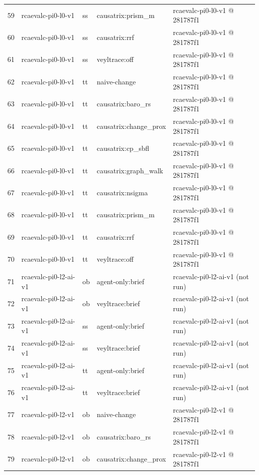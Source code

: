 \begin{longtable}{@{}r>{\raggedright\arraybackslash}p{87.0pt}>{\raggedright\arraybackslash}p{18.0pt}>{\raggedright\arraybackslash}p{63.0pt}>{\raggedright\arraybackslash}p{108.0pt}@{}}
59 & rcaevalc-pi0-l0-v1 & ss & causatrix:prism\_m & rcaevalc-pi0-l0-v1 @ 281787f1 \\
60 & rcaevalc-pi0-l0-v1 & ss & causatrix:rrf & rcaevalc-pi0-l0-v1 @ 281787f1 \\
61 & rcaevalc-pi0-l0-v1 & ss & veyltrace:off & rcaevalc-pi0-l0-v1 @ 281787f1 \\
62 & rcaevalc-pi0-l0-v1 & tt & naive-change & rcaevalc-pi0-l0-v1 @ 281787f1 \\
63 & rcaevalc-pi0-l0-v1 & tt & causatrix:baro\_rs & rcaevalc-pi0-l0-v1 @ 281787f1 \\
64 & rcaevalc-pi0-l0-v1 & tt & causatrix:change\_prox & rcaevalc-pi0-l0-v1 @ 281787f1 \\
65 & rcaevalc-pi0-l0-v1 & tt & causatrix:cp\_sbfl & rcaevalc-pi0-l0-v1 @ 281787f1 \\
66 & rcaevalc-pi0-l0-v1 & tt & causatrix:graph\_walk & rcaevalc-pi0-l0-v1 @ 281787f1 \\
67 & rcaevalc-pi0-l0-v1 & tt & causatrix:nsigma & rcaevalc-pi0-l0-v1 @ 281787f1 \\
68 & rcaevalc-pi0-l0-v1 & tt & causatrix:prism\_m & rcaevalc-pi0-l0-v1 @ 281787f1 \\
69 & rcaevalc-pi0-l0-v1 & tt & causatrix:rrf & rcaevalc-pi0-l0-v1 @ 281787f1 \\
70 & rcaevalc-pi0-l0-v1 & tt & veyltrace:off & rcaevalc-pi0-l0-v1 @ 281787f1 \\
71 & rcaevalc-pi0-l2-ai-v1 & ob & agent-only:brief & rcaevalc-pi0-l2-ai-v1 (not run) \\
72 & rcaevalc-pi0-l2-ai-v1 & ob & veyltrace:brief & rcaevalc-pi0-l2-ai-v1 (not run) \\
73 & rcaevalc-pi0-l2-ai-v1 & ss & agent-only:brief & rcaevalc-pi0-l2-ai-v1 (not run) \\
74 & rcaevalc-pi0-l2-ai-v1 & ss & veyltrace:brief & rcaevalc-pi0-l2-ai-v1 (not run) \\
75 & rcaevalc-pi0-l2-ai-v1 & tt & agent-only:brief & rcaevalc-pi0-l2-ai-v1 (not run) \\
76 & rcaevalc-pi0-l2-ai-v1 & tt & veyltrace:brief & rcaevalc-pi0-l2-ai-v1 (not run) \\
77 & rcaevalc-pi0-l2-v1 & ob & naive-change & rcaevalc-pi0-l2-v1 @ 281787f1 \\
78 & rcaevalc-pi0-l2-v1 & ob & causatrix:baro\_rs & rcaevalc-pi0-l2-v1 @ 281787f1 \\
79 & rcaevalc-pi0-l2-v1 & ob & causatrix:change\_prox & rcaevalc-pi0-l2-v1 @ 281787f1 \\

\end{longtable}
